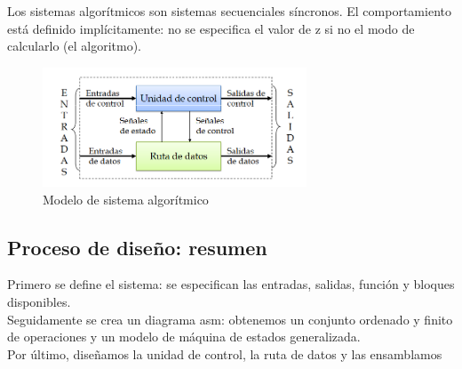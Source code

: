 Los sistemas algorítmicos son sistemas secuenciales síncronos. El comportamiento está definido implícitamente: no se especifica el valor de z si no el modo de calcularlo (el algoritmo).
\begin{figure}[H]
	\centering
	\includegraphics[width=0.7\textwidth]{images/Tema_4/Modelo_algoritmico.PNG}
	\caption{Modelo de sistema algorítmico}
\end{figure}

\subsection{Proceso de diseño: resumen}
Primero se define el sistema: se especifican las entradas, salidas, función y bloques disponibles.\\
Seguidamente se crea un diagrama \gls{asm}: obtenemos un conjunto ordenado y finito de operaciones y un modelo de máquina de estados generalizada.\\

Por último, diseñamos la unidad de control, la ruta de datos y las ensamblamos
